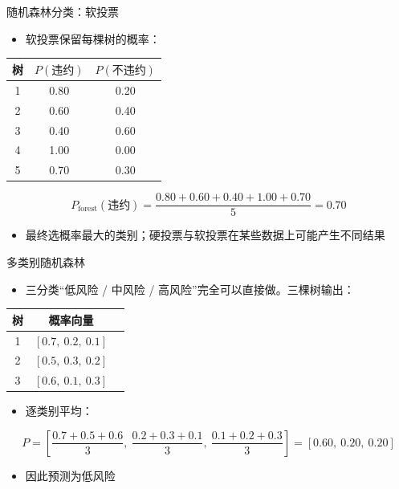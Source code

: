 \documentclass[10pt,aspectratio=43]{beamer}
\begin{document}
\begin{frame}{随机森林分类：软投票}
  \begin{itemize}
    \item 软投票保留每棵树的概率：
  \end{itemize}
  \vspace{-1ex}
  \begin{center}
  \begin{tabular}{ccc}
    \toprule
    树 & $P(\text{违约})$ & $P(\text{不违约})$ \\
    \midrule
    1 & 0.80 & 0.20 \\
    2 & 0.60 & 0.40 \\
    3 & 0.40 & 0.60 \\
    4 & 1.00 & 0.00 \\
    5 & 0.70 & 0.30 \\
    \bottomrule
  \end{tabular}
  \end{center}
  \[
    P_{\text{forest}}(\text{违约})=\frac{0.80+0.60+0.40+1.00+0.70}{5}=0.70
  \]
  \begin{itemize}
    \item 最终选概率最大的类别；硬投票与软投票在某些数据上可能产生不同结果
  \end{itemize}
\end{frame}

\begin{frame}{多类别随机森林}
  \begin{itemize}
    \item 三分类“低风险 / 中风险 / 高风险”完全可以直接做。三棵树输出：
  \end{itemize}
  \begin{center}
  \begin{tabular}{ccc}
    \toprule
    树 & 概率向量 & \\
    \midrule
    1 & $[0.7,\ 0.2,\ 0.1]$ & \\
    2 & $[0.5,\ 0.3,\ 0.2]$ & \\
    3 & $[0.6,\ 0.1,\ 0.3]$ & \\
    \bottomrule
  \end{tabular}
  \end{center}
  \begin{itemize}
    \item 逐类别平均：
  \end{itemize}
  \[
    P=\left[\frac{0.7+0.5+0.6}{3},\ \frac{0.2+0.3+0.1}{3},\ \frac{0.1+0.2+0.3}{3}\right]
    =[0.60,\ 0.20,\ 0.20]
  \]
  \begin{itemize}
    \item 因此预测为低风险
  \end{itemize}
\end{frame}
\end{document}
